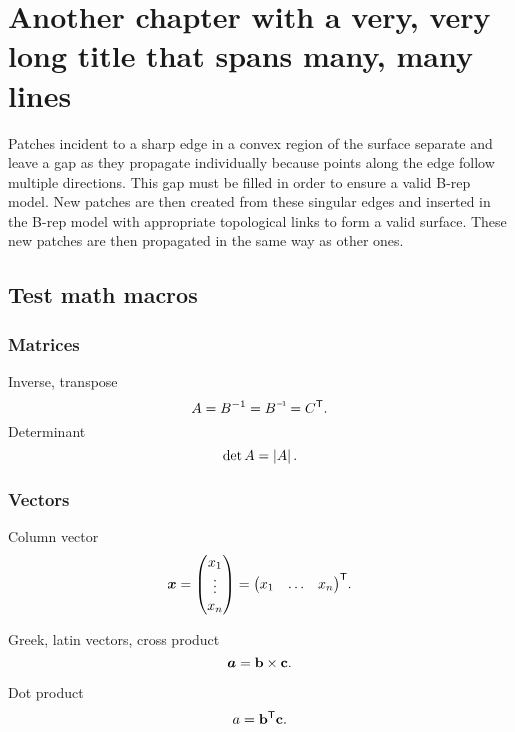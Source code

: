 \def\chapterabstract{This is the chapter abstract.}
\chapter{Another chapter with a very, very long title that spans many, many lines}%

\printskip Patches incident to a sharp edge in a convex region of the surface separate and leave a gap as they propagate individually because points along the edge follow multiple directions. 
This gap must be filled in order to ensure a valid B-rep model. New patches are then created from these singular edges and inserted in the B-rep model with appropriate topological links to form a valid surface. These new patches are then propagated in the same way as other ones.

\section{Test math macros}
\label{sec:testmathmacros}
\subsection{Matrices}
Inverse, transpose
\begin{equation}
	A = \inverse{B} = \inv{B} = \transpose{C}.
\end{equation}
Determinant
\begin{equation}
	\det A = \left\lvert {A} \right\rvert.
\end{equation}

\subsection{Vectors}

Column vector
\begin{equation}
	\boldsymbol{x} = \begin{pmatrix}  x_1 \\ \vdots \\ x_n  \end{pmatrix}
    = {\begin{pmatrix}  x_1 & \ldots & x_n  \end{pmatrix}} ^\mathsf{T}.
\end{equation}

Greek, latin vectors, cross product
\begin{equation}
	\boldsymbol{a} = {\mathbf{b}} \times {\mathbf{c}}.
\end{equation}

Dot product
\begin{equation}
	a = {\mathbf{b}} ^\mathsf{T} {\mathbf{c}}.
\end{equation}

